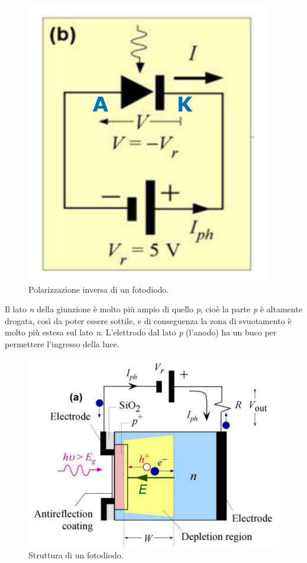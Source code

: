 \documentclass[a4paper,11pt]{article}
\begin{document}
\renewcommand{\thefigure}{3.1}
\begin{figure}[!h]
  \centering
    \includegraphics[scale=0.4]{images/3/reverse_bias.png}
    \caption{Polarizzazione inversa di un fotodiodo.}
\end{figure}

Il lato \textit{n} della giunzione è molto più ampio di quello \textit{p}, cioè la parte \textit{p} è altamente drogata,
così da poter essere sottile, e di conseguenza la zona di svuotamento è molto più estesa sul lato \textit{n}.
L'elettrodo dal lato \textit{p} (l'anodo) ha un buco per permettere l'ingresso della luce.

\renewcommand{\thefigure}{3.2}
\begin{figure}[!h]
  \centering
    \includegraphics[scale=0.4]{images/3/inside_photodiode.png}
    \caption{Struttura di un fotodiodo.}
\end{figure}
\end{document}

